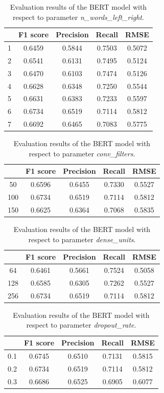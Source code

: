 \documentclass[11pt,a4paper]{article}
\begin{document}
\begin{table}[h]
\centering
\begin{tabular}{ccccc}
  & F1 score & Precision & Recall & RMSE   \\ \hline
1 & 0.6459   & 0.5844    & 0.7503 & 0.5072 \\
2 & 0.6541   & 0.6131    & 0.7495 & 0.5124 \\
3 & 0.6470   & 0.6103    & 0.7474 & 0.5126 \\
4 & 0.6628   & 0.6348    & 0.7250 & 0.5544 \\
5 & 0.6631   & 0.6383    & 0.7233 & 0.5597 \\
6 & 0.6734   & 0.6519    & 0.7114 & 0.5812 \\
7 & 0.6692   & 0.6465    & 0.7083 & 0.5775
\end{tabular}
\caption{Evaluation results of the BERT model with respect to parameter \textit{n\_words\_left\_right}.}
\label{tab:bert-results-1}
\end{table}

\begin{table}[h]
\centering
\begin{tabular}{ccccc}
    & F1 score & Precision & Recall & RMSE   \\ \hline
50  & 0.6596   & 0.6455    & 0.7330 & 0.5527 \\
100 & 0.6734   & 0.6519    & 0.7114 & 0.5812 \\
150 & 0.6625   & 0.6364    & 0.7068 & 0.5835
\end{tabular}
\caption{Evaluation results of the BERT model with respect to parameter \textit{conv\_filters}.}
\label{tab:bert-results-2}
\end{table}

\begin{table}[h]
\centering
\begin{tabular}{ccccc}
    & F1 score & Precision & Recall & RMSE   \\ \hline
64  & 0.6461   & 0.5661    & 0.7524 & 0.5058 \\
128 & 0.6585   & 0.6305    & 0.7262 & 0.5527 \\
256 & 0.6734   & 0.6519    & 0.7114 & 0.5812
\end{tabular}
\caption{Evaluation results of the BERT model with respect to parameter \textit{dense\_units}.}
\label{tab:bert-results-3}
\end{table}

\begin{table}[h]
\centering
\begin{tabular}{ccccc}
    & F1 score & Precision & Recall & RMSE   \\ \hline
0.1 & 0.6745   & 0.6510    & 0.7131 & 0.5815 \\
0.2 & 0.6734   & 0.6519    & 0.7114 & 0.5812 \\
0.3 & 0.6686   & 0.6525    & 0.6905 & 0.6077
\end{tabular}
\caption{Evaluation results of the BERT model with respect to parameter \textit{dropout\_rate}.}
\label{tab:bert-results-4}
\end{table}
\end{document}

